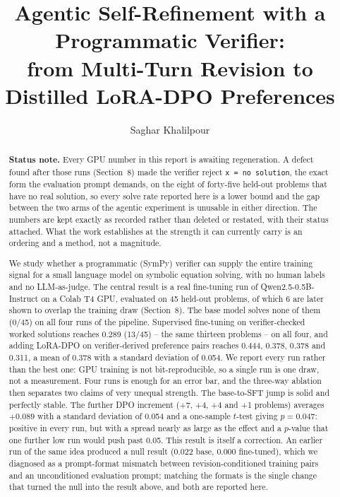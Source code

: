 \documentclass[11pt]{article}
\title{Agentic Self-Refinement with a Programmatic Verifier:\\
from Multi-Turn Revision to Distilled LoRA-DPO Preferences}
\author{Saghar Khalilpour}
\date{}
\begin{document}
\maketitle

\begin{abstract}
\textbf{Status note.} Every GPU number in this report is awaiting
regeneration. A defect found after those runs (Section~8) made the verifier
reject \texttt{x = no solution}, the exact form the evaluation prompt
demands, on the eight of forty-five held-out problems that have no real
solution, so every solve rate reported here is a lower bound and the gap
between the two arms of the agentic experiment is unusable in either
direction. The numbers are kept exactly as recorded rather than deleted or
restated, with their status attached. What the work establishes at the
strength it can currently carry is an ordering and a method, not a magnitude.

We study whether a programmatic (SymPy) verifier can supply the entire
training signal for a small language model on symbolic equation solving,
with no human labels and no LLM-as-judge. The central result is a real
fine-tuning run of Qwen2.5-0.5B-Instruct on a Colab T4 GPU, evaluated on 45
held-out problems, of which 6 are later shown to overlap the training draw
(Section~8). The base model solves
none of them (0/45) on all four runs of the pipeline. Supervised
fine-tuning on verifier-checked worked solutions reaches 0.289 (13/45) --
the same thirteen problems -- on all four, and adding LoRA-DPO on
verifier-derived preference pairs reaches 0.444, 0.378, 0.378 and 0.311, a
mean of 0.378 with a standard deviation of 0.054. We report every run rather
than the best one: GPU training is not bit-reproducible, so a single run is
one draw, not a measurement. Four runs is enough for an error bar, and the
three-way ablation then separates two claims of very unequal strength. The
base-to-SFT jump is solid and perfectly stable. The further DPO increment
(+7, +4, +4 and +1 problems) averages $+0.089$ with a standard deviation of
0.054 and a one-sample $t$-test giving $p=0.047$: positive in every run, but
with a spread nearly as large as the effect and a $p$-value that one further
low run would push past 0.05. This result is itself a correction. An earlier run of the same
idea produced a null result (0.022 base, 0.000 fine-tuned), which we
diagnosed as a prompt-format mismatch between revision-conditioned training
pairs and an unconditioned evaluation prompt; matching the formats is the
single change that turned the null into the result above, and both are
reported here.


\end{abstract}
\end{document}
